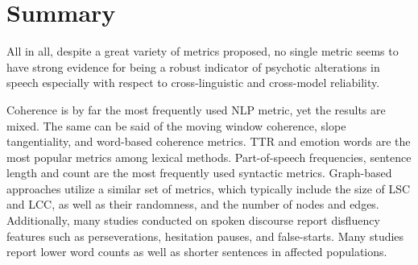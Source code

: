 \begin{table}[ht]
\captionsetup{width=\textwidth}
\caption[Comparison of graph-based, syntactic, and language model-based methods.]{\label{tab:comparison:Graph-Synt-LM} Comparison between graph-based (Graph), syntactic (Synt), and language model-based methods (LM). 
\\ ``+'' indicates significant group difference or correlation for most metrics tested within the group. ``?'' indicates mixed results with some metrics showing significant results but not others. ``!'' indicates an absence of significant differences in the metrics tested. The studies on clinical high-risk populations are shown in italics.}
\end{table}


\section{Summary}
\label{sec:review:summary}

All in all, despite a great variety of metrics proposed, no single metric seems to have strong evidence for being a robust indicator of psychotic alterations in speech especially with respect to cross-linguistic and cross-model reliability. 


Coherence is by far the most frequently used NLP metric, yet the results are mixed. The same can be said of the moving window coherence, slope tangentiality, and word-based coherence metrics.  TTR and emotion words are the most popular metrics among lexical methods. Part-of-speech frequencies, sentence length and count are the most frequently used syntactic metrics. Graph-based approaches utilize a similar set of metrics, which typically include the size of LSC and LCC, as well as their randomness, and the number of nodes and edges. Additionally, many studies conducted on spoken discourse report disfluency features such as perseverations, hesitation pauses, and false-starts. Many studies report lower word counts as well as shorter sentences in affected populations.



